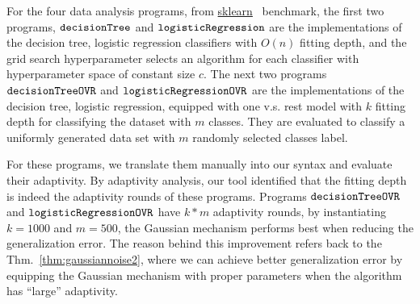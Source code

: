 For the four data analysis programs, 
from \hyperlink{https://github.com/scikit-learn/scikit-learn/tree/main/examples}{sklearn}~\cite{SklearnBenchmark} benchmark,
the first two programs, $\mathtt{decisionTree}$ and $\mathtt{logisticRegression}$ are
the
implementations of the decision tree, logistic regression classifiers
with $O(n)$ fitting depth,
and the grid search hyperparameter selects an algorithm for each classifier with 
hyperparameter space of constant size $c$.
The next two programs $\mathtt{decisionTreeOVR}$ and $\mathtt{logisticRegressionOVR}$ are
the implementations of the decision tree, logistic regression, equipped with one v.s. rest model with $k$ fitting depth for classifying the dataset with $m$ classes.
They are evaluated to classify a uniformly generated data set with $m$ randomly selected classes label.

For these programs, we translate them manually into our syntax and evaluate their adaptivity.
By adaptivity analysis, our tool identified that the fitting depth is indeed the adaptivity rounds of these programs.
Programs $\mathtt{decisionTreeOVR}$ and $\mathtt{logisticRegressionOVR}$ 
have $k*m$ adaptivity rounds, by instantiating $k = 1000$ and $m = 500$,
the Gaussian mechanism performs best when reducing the generalization error.
The reason behind this improvement refers back to the Thm.~\ref{thm:gaussiannoise2}, where
we can achieve better generalization error by equipping the Gaussian mechanism with proper parameters when the algorithm has ``large'' adaptivity.



